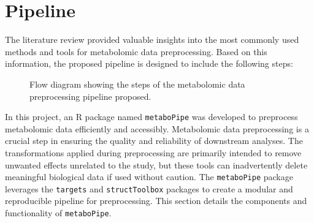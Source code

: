 \documentclass[ENG, BIB]{TFUOC}%
\begin{document}
\section{Pipeline}
The literature review provided valuable insights into the most commonly used methods and tools for metabolomic data preprocessing. Based on this information, the proposed pipeline is designed to include the following steps:
\begin{figure}[ht]
    \centering
{}
  \caption{Flow diagram showing the steps of the metabolomic data preprocessing pipeline proposed.}
  \label{fig:pipeline}
\end{figure}
  
In this project, an R package named \texttt{metaboPipe} was developed to preprocess metabolomic data efficiently and accessibly. Metabolomic data preprocessing is a crucial step in ensuring the quality and reliability of downstream analyses. The transformations applied during preprocessing are primarily intended to remove unwanted effects unrelated to the study, but these tools can inadvertently delete meaningful biological data if used without caution. The \texttt{metaboPipe} package leverages the \texttt{targets} and \texttt{structToolbox} packages to create a modular and reproducible pipeline for preprocessing. This section details the components and functionality of \texttt{metaboPipe}.
\end{document}
